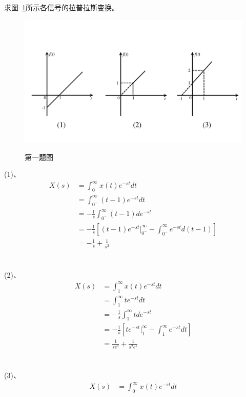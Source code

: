 \documentclass[answers]{exam}  %
\begin{document}
\Large
{}
\begin{questions}
	
	

\question 求图~\ref{Figure:question_1}所示各信号的拉普拉斯变换。
\begin{figure}[!h]
	\centering
	\includegraphics[width=\linewidth]{pics/question_1.pdf}
	\label{Figure:question_1}
	\caption{第一题图}
\end{figure}
\begin{solution}
	(1)、
\begin{align*}
	X(s)&=\int_{0^-}^{\infty}x(t)e^{-st}dt\\
	&=\int_{0^-}^{\infty}(t-1)e^{-st}dt\\
	&=-\frac{1}{s}\int_{0^-}^\infty(t-1)de^{-st}\\
	&=-\frac{1}{s}[(t-1)e^{-st}|_{0^-}^\infty-\int_{0^-}^\infty e^{-st}d(t-1)]\\
	&=-\frac{1}{s}+\frac{1}{s^2}
\end{align*}\\
	~\\
	(2)、
	\begin{align*}
		X(s)&=\int_{1}^{\infty}x(t)e^{-st}dt\\
		&=\int_{1}^{\infty}te^{-st}dt\\
		&=-\frac{1}{s}\int_{1}^{\infty}tde^{-st}\\
		&=-\frac{1}{s}[te^{-st}|_1^{\infty}-\int_{1}^\infty e^{-st}dt]\\
		&=\frac{1}{se^s}+\frac{1}{s^2e^s}
	\end{align*}\\
	~\\
	(3)、	
	\begin{align*}
		X(s)&=\int_{0^-}^{\infty}x(t)e^{-st}dt\\

\end{align*}
\end{solution}
\end{questions}
\end{document}
